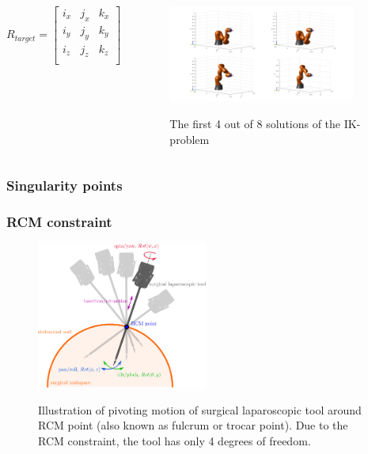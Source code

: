 \begin{frame}
\begin{columns}
\[
R_{target} = 
\begin{bmatrix}
i_x & j_x & k_x\\
i_y & j_y & k_y\\
i_z & j_z & k_z\\
\end{bmatrix}
\]
\begin{center}
\begin{figure}[!htb]
\centering
\includegraphics[width=0.9\textwidth]{../images/ik-4-solutions.png}\\
\caption{The first 4 out of 8 solutions of the IK-problem}
\end{figure}
\end{center}
\end{columns}
\end{frame}

\begin{frame}
\frametitle{Singularity points}
\end{frame}

\begin{frame}
\frametitle{RCM constraint}
\begin{center}
\begin{figure}[H]
\centering
\includegraphics[width=0.5\textwidth]{../images/rcm-surgical-tool.png}\\
\caption{Illustration of pivoting motion of surgical laparoscopic tool around RCM point (also known as fulcrum or trocar point). Due to the RCM constraint, the tool has only 4 degrees of freedom.}
\end{figure}
\end{center}
\end{frame}

